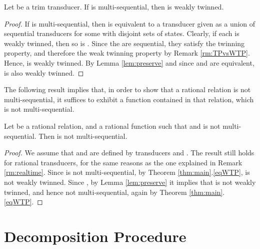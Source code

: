 \documentclass[envcountsame]{llncs}
\newcommand\eof{\hfill}
\begin{document}
\begin{lemma}\label{lem:necessary}
    Let  be a trim transducer. If  is
    multi-sequential, then  is weakly twinned. 
\end{lemma}

\begin{proof}
    If  is multi-sequential, then  is equivalent to a
    transducer  given as a union of  sequential transducers  for some  with disjoint sets of states. Clearly, if each  is weakly twinned, then 
    so is . Since the  are sequential, they
    satisfy the twinning property, and therefore the weak twinning
    property by Remark \ref{rm:TPvsWTP}. Hence,  is weakly
    twinned. By Lemma \ref{lem:preserve} and since  and 
    are equivalent,  is also weakly twinned. \eof
\end{proof}

The following result implies that,  in order to show that a rational relation is not
multi-sequential, it suffices to exhibit a function contained in that
relation, which is not multi-sequential. 

\begin{corollary}
    Let  be a rational relation, and  a rational function such that
     and  is not multi-sequential. Then  is not
    multi-sequential. 
\end{corollary}

\begin{proof}
    We assume that  and  are defined by transducers
     and . The result still holds for 
    rational transducers, for the same reasons as the one explained in
    Remark \ref{rm:realtime}. Since  is
    not multi-sequential, by Theorem \ref{thm:main}.\ref{eqWTP},
     is not weakly twinned. Since , by Lemma
    \ref{lem:preserve} it implies that  is not weakly twinned, and hence not
    multi-sequential, again by Theorem
    \ref{thm:main}.\ref{eqWTP}. \eof
\end{proof}







\section{Decomposition Procedure}\label{sec:decomposition}
\end{document}
